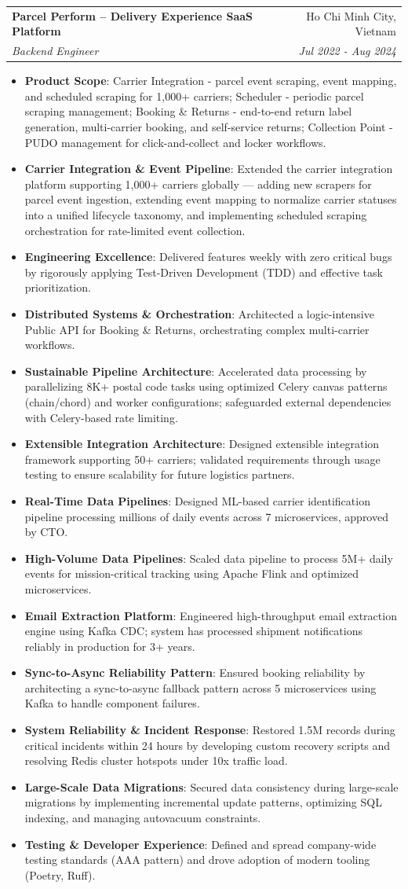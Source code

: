 \documentclass[letterpaper,11pt]{article}
\makeatletter
\newcommand{\resumeItem}[2]{
  \item\small{
    \textbf{#1}{: #2 \vspace{-2pt}}
  }
}
\newcommand{\resumeSubheading}[4]{
  \vspace{-1pt}\item
    \begin{tabular*}{0.97\textwidth}{l@{\extracolsep{\fill}}r}
      \textbf{#1} & #2 \\
      \textit{\small#3} & \textit{\small #4} \\
    \end{tabular*}\vspace{-5pt}
}
\newcommand{\resumeItemListStart}{\begin{itemize}}
\newcommand{\resumeItemListEnd}{\end{itemize}\vspace{-5pt}}
\makeatother
\begin{document}
    \resumeSubheading
      {Parcel Perform -- Delivery Experience SaaS Platform}{Ho Chi Minh City, Vietnam}
      {Backend Engineer}{Jul 2022 - Aug 2024}
      \resumeItemListStart
        \resumeItem{Product Scope}
          {Carrier Integration - parcel event scraping, event mapping, and scheduled scraping for 1,000+ carriers; Scheduler - periodic parcel scraping management; Booking \& Returns - end-to-end return label generation, multi-carrier booking, and self-service returns; Collection Point - PUDO management for click-and-collect and locker workflows.}
        \resumeItem{Carrier Integration \& Event Pipeline}
          {Extended the carrier integration platform supporting 1,000+ carriers globally — adding new scrapers for parcel event ingestion, extending event mapping to normalize carrier statuses into a unified lifecycle taxonomy, and implementing scheduled scraping orchestration for rate-limited event collection.}
        \resumeItem{Engineering Excellence}
          {Delivered features weekly with zero critical bugs by rigorously applying Test-Driven Development (TDD) and effective task prioritization.}
        \resumeItem{Distributed Systems \& Orchestration}
          {Architected a logic-intensive Public API for Booking \& Returns, orchestrating complex multi-carrier workflows.}
        \resumeItem{Sustainable Pipeline Architecture}
          {Accelerated data processing by parallelizing 8K+ postal code tasks using optimized Celery canvas patterns (chain/chord) and worker configurations; safeguarded external dependencies with Celery-based rate limiting.}
        \resumeItem{Extensible Integration Architecture}
          {Designed extensible integration framework supporting 50+ carriers; validated requirements through usage testing to ensure scalability for future logistics partners.}
        \resumeItem{Real-Time Data Pipelines}
          {Designed ML-based carrier identification pipeline processing millions of daily events across 7 microservices, approved by CTO.}
        \resumeItem{High-Volume Data Pipelines}
          {Scaled data pipeline to process 5M+ daily events for mission-critical tracking using Apache Flink and optimized microservices.}
        \resumeItem{Email Extraction Platform}
          {Engineered high-throughput email extraction engine using Kafka CDC; system has processed shipment notifications reliably in production for 3+ years.}
        \resumeItem{Sync-to-Async Reliability Pattern}
          {Ensured booking reliability by architecting a sync-to-async fallback pattern across 5 microservices using Kafka to handle component failures.}
        \resumeItem{System Reliability \& Incident Response}
          {Restored 1.5M records during critical incidents within 24 hours by developing custom recovery scripts and resolving Redis cluster hotspots under 10x traffic load.}
        \resumeItem{Large-Scale Data Migrations}
          {Secured data consistency during large-scale migrations by implementing incremental update patterns, optimizing SQL indexing, and managing autovacuum constraints.}
        \resumeItem{Testing \& Developer Experience}
          {Defined and spread company-wide testing standards (AAA pattern) and drove adoption of modern tooling (Poetry, Ruff).}
      \resumeItemListEnd
\end{document}
